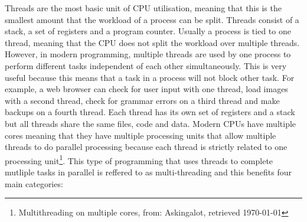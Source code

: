 Threads are the most basic unit of CPU utilisation, meaning that this is the smallest amount that the workload of a 
process can be split. Threads consist of a stack, a set of registers and a program counter. Usually a process
is tied to one thread, meaning that the CPU does not split the workload over multiple threads. However, in
modern programming, multiple threads are used by one process to perform different tasks independent of each other
simultaneously. This is very useful because this means that a task in a process will not block 
other task. For example, a web browser can check for user input with one thread, load images with a second thread,
check for grammar errors on a third thread and make backups on a fourth thread. Each thread has its own set of registers
and a stack but all threads share the same files, code and data. Modern CPUs have multiple cores meaning that they have
multiple processing units that allow multiple threads to do parallel processing because each thread is strictly
related to one processing unit\footnote{ Multithreading on multiple cores, from: Askingalot, retrieved \today}. This type of programming that uses threads to complete mutliple tasks
in parallel is reffered to as multi-threading and this benefits four main categories:


